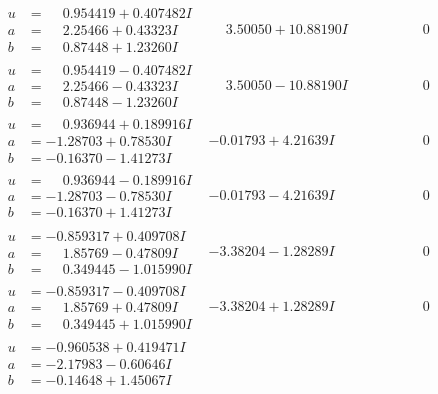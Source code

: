 \documentclass[1p]{elsarticle_modified}
\theoremstyle{definition}
\begin{document}
$$\begin{array}{c|c|c}
\begin{aligned}
u &= \phantom{-}0.954419 + 0.407482 I \\
a &= \phantom{-}2.25466 + 0.43323 I \\
b &= \phantom{-}0.87448 + 1.23260 I\end{aligned}
 & \phantom{-}3.50050 + 10.88190 I & \phantom{-0.000000 } 0 \\ \hline\begin{aligned}
u &= \phantom{-}0.954419 - 0.407482 I \\
a &= \phantom{-}2.25466 - 0.43323 I \\
b &= \phantom{-}0.87448 - 1.23260 I\end{aligned}
 & \phantom{-}3.50050 - 10.88190 I & \phantom{-0.000000 } 0 \\ \hline\begin{aligned}
u &= \phantom{-}0.936944 + 0.189916 I \\
a &= -1.28703 + 0.78530 I \\
b &= -0.16370 - 1.41273 I\end{aligned}
 & -0.01793 + 4.21639 I & \phantom{-0.000000 } 0 \\ \hline\begin{aligned}
u &= \phantom{-}0.936944 - 0.189916 I \\
a &= -1.28703 - 0.78530 I \\
b &= -0.16370 + 1.41273 I\end{aligned}
 & -0.01793 - 4.21639 I & \phantom{-0.000000 } 0 \\ \hline\begin{aligned}
u &= -0.859317 + 0.409708 I \\
a &= \phantom{-}1.85769 - 0.47809 I \\
b &= \phantom{-}0.349445 - 1.015990 I\end{aligned}
 & -3.38204 - 1.28289 I & \phantom{-0.000000 } 0 \\ \hline\begin{aligned}
u &= -0.859317 - 0.409708 I \\
a &= \phantom{-}1.85769 + 0.47809 I \\
b &= \phantom{-}0.349445 + 1.015990 I\end{aligned}
 & -3.38204 + 1.28289 I & \phantom{-0.000000 } 0 \\ \hline\begin{aligned}
u &= -0.960538 + 0.419471 I \\
a &= -2.17983 - 0.60646 I \\
b &= -0.14648 + 1.45067 I\end{aligned}

\end{array}$$
\end{document}
